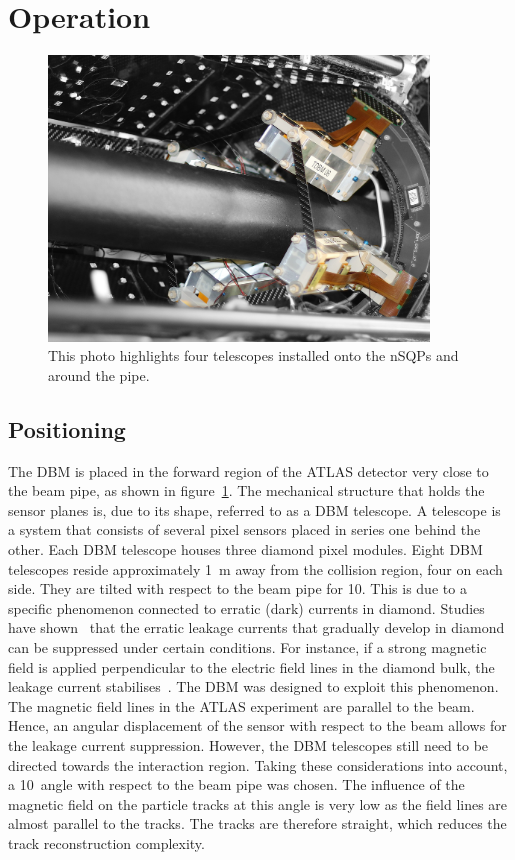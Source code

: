 \section{Operation}
\label{sec:operation}
\begin{figure}[!t]
\centering
\includegraphics[width=0.9\textwidth]{04_charge_monitoring/pics/DBM-installed-colour1}
\caption{This photo highlights four telescopes installed onto the nSQPs and around the pipe.}
\label{fig:dbminatlas}
\end{figure}

\subsection{Positioning}
The DBM is placed in the forward region of the ATLAS detector very close to the beam pipe, as shown in figure~\ref{fig:dbminatlas}. The mechanical structure that holds the sensor planes is, due to its shape, referred to as a DBM telescope. A telescope is a system that consists of several pixel sensors placed in series one behind the other. Each DBM telescope houses three diamond pixel modules. Eight DBM telescopes reside approximately 1~m away from the collision region, four on each side. They are tilted with respect to the beam pipe for 10\textdegree. This is due to a specific phenomenon connected to erratic (dark) currents in diamond. Studies have shown~\cite{} that the erratic leakage currents that gradually develop in diamond can be suppressed under certain conditions. For instance, if a strong magnetic field is applied perpendicular to the electric field lines in the diamond bulk, the leakage current stabilises~\cite{}. The DBM was designed to exploit this phenomenon. The magnetic field lines in the ATLAS experiment are parallel to the beam. Hence, an angular displacement of the sensor with respect to the beam allows for the leakage current suppression. However, the DBM telescopes still need to be directed towards the interaction region. Taking these considerations into account, a 10\textdegree~angle with respect to the beam pipe was chosen. The influence of the magnetic field on the particle tracks at this angle is very low as the field lines are almost parallel to the tracks. The tracks are therefore straight, which reduces the track reconstruction complexity.


